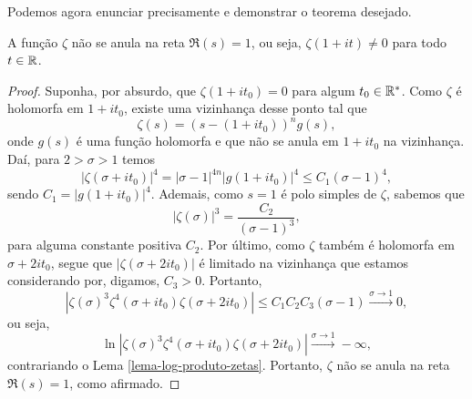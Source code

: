     
    Podemos agora enunciar precisamente e demonstrar o teorema desejado.
    \begin{teorema}
    \label{teo-zeta-nao-nula-re1}
        A função $\zeta$ não se anula na reta $\Re(s) = 1$, ou seja,
        $\zeta(1 + it) \neq 0$ para todo $t\in\mathbb{R}$.
    \end{teorema}
    \begin{proof}
        Suponha, por absurdo, que $\zeta(1 + it_0) = 0$ para algum 
        $t_0\in\mathbb{R}^*$. Como $\zeta$ é holomorfa em $1 + it_0$, existe
        uma vizinhança desse ponto tal que
        \[
        \zeta(s) = (s - (1 + it_0))^n g(s),
        \]
        onde $g(s)$ é uma função holomorfa e que não se anula em $1 + it_0$
        na vizinhança. Daí, para $2 > \sigma > 1$ temos
        \[
        |\zeta(\sigma + it_0)|^4 = |\sigma-1|^{4n}|g(1 + it_0)|^4
                                 \leq C_1(\sigma-1)^4,
        \]
        sendo $C_1 = |g(1+it_0)|^4$. Ademais, como $s=1$ é polo simples
        de $\zeta$, sabemos que
        \[
        |\zeta(\sigma)|^3 = \frac{C_2}{(\sigma - 1)^3},
        \]
        para alguma constante positiva $C_2$. Por último, como $\zeta$ 
        também é holomorfa em $\sigma + 2it_0$, segue que
        $|\zeta(\sigma + 2it_0)|$ é limitado na vizinhança que estamos
        considerando por, digamos, $C_3 > 0$. Portanto,
        \[
        |\zeta(\sigma)^3\zeta^4(\sigma + it_0)\zeta(\sigma + 2it_0)|
        \leq C_1C_2C_3(\sigma - 1) \xrightarrow{\sigma\to 1} 0,
        \]
        ou seja,
        \[
        \ln|\zeta(\sigma)^3\zeta^4(\sigma + it_0)\zeta(\sigma + 2it_0)| 
        \xrightarrow{\sigma\to 1} -\infty,
        \]
        contrariando o Lema \ref{lema-log-produto-zetas}. Portanto,
        $\zeta$ não se anula na reta $\Re(s) = 1$, como afirmado.
    \end{proof}
